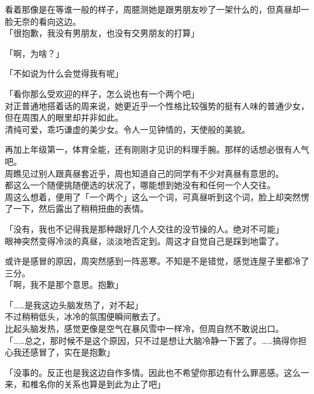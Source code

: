 看着那像是在等谁一般的样子，周臆测她是跟男朋友吵了一架什么的，但真昼却一脸无奈的看向这边。\\

「很抱歉，我没有男朋友，也没有交男朋友的打算」

「啊，为啥？」

「不如说为什么会觉得我有呢」

「看你那么受欢迎的样子，怎么说也有一个两个吧」\\

对正普通地搭着话的周来说，她更近乎一个性格比较强势的挺有人味的普通少女，但在周围人的眼里却并非如此。\\

清纯可爱，乖巧谦虚的美少女。令人一见钟情的，天使般的美貌。

再加上年级第一，体育全能，还有刚刚才见识的料理手腕。那样的话想必很有人气吧。\\

周瞧见过别人跟真昼套近乎，周也知道自己的同学有不少对真昼有意思的。\\

都这么一个随便挑随便选的状况了，哪能想到她没有和任何一个人交往。\\

周这么想着，便用了「一个两个」这么一个词，可真昼听到这个词，脸上却突然愣了一下，然后露出了稍稍扭曲的表情。

「没有，我也不记得我是那种跟好几个人交往的没节操的人。绝对不可能」\\

眼神突然变得冷淡的真昼，淡淡地否定到。周这才自觉自己是踩到地雷了。

或许是感冒的原因，周突然感到一阵恶寒。不知是不是错觉，感觉连屋子里都冷了三分。\\

「啊，我不是那个意思。抱歉」

「……是我这边头脑发热了，对不起」\\

不过稍稍低头，冰冷的氛围便瞬间散去了。\\

比起头脑发热，感觉更像是空气在暴风雪中一样冷，但周自然不敢说出口。\\

「……总之，那时候不是这个原因，只不过是想让大脑冷静一下罢了。……搞得你担心我还感冒了，实在是抱歉」

「没事的。反正也是我这边自作多情。因此也不希望你那边有什么罪恶感。这么一来，和椎名你的关系也算是到此为止了吧」\\

